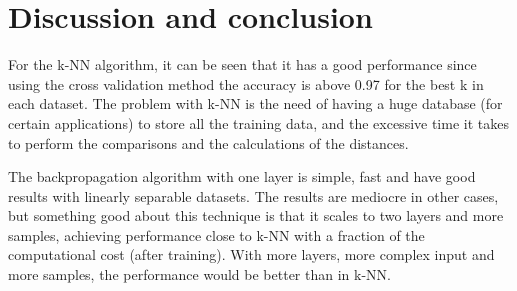 \documentclass{article}
\begin{document}
\section{Discussion and conclusion}
For the k-NN algorithm, it can be seen that it has a good performance since using the cross validation method the accuracy is above 0.97 for the best k in each dataset. The problem with k-NN is the need of having a huge database (for certain applications) to store all the training data, and the excessive time it takes to perform the comparisons and the calculations of the distances.

The backpropagation algorithm with one layer is simple, fast and have good results with linearly separable datasets. The results are mediocre in other cases, but something good about this technique is that it scales to two layers and more samples, achieving performance close to k-NN with a fraction of the computational cost (after training). With more layers, more complex input and more samples, the performance would be better than in k-NN.
\end{document}
